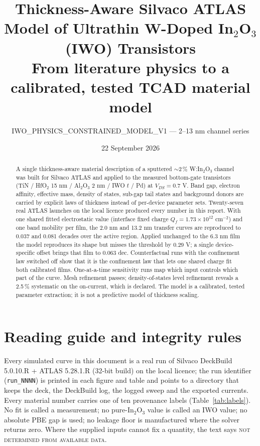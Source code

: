 \documentclass[11pt,a4paper]{article}
\title{Thickness-Aware Silvaco ATLAS Model of Ultrathin W-Doped In$_2$O$_3$ (IWO) Transistors\\[4pt]
\large From literature physics to a calibrated, tested TCAD material model}
\author{IWO\_PHYSICS\_CONSTRAINED\_MODEL\_V1 --- 2--13 nm channel series}
\date{22 September 2026}
\newcommand{\ND}{\textsc{not determined from available data}}
\begin{document}
\maketitle

\begin{abstract}
A single thickness-aware material description of a sputtered $\sim$2\,\% W:In$_2$O$_3$ channel was built for Silvaco ATLAS and applied to the measured bottom-gate transistors (TiN / HfO$_2$ 15 nm / Al$_2$O$_3$ 2 nm / IWO $t$ / Pd) at $V_{DS}=0.7$ V. Band gap, electron affinity, effective mass, density of states, sub-gap tail states and background donors are carried by explicit laws of thickness instead of per-device parameter sets. Twenty-seven real ATLAS launches on the local licence produced every number in this report. With one shared fitted electrostatic value (interface fixed charge $Q_f=1.73\times10^{12}$ cm$^{-2}$) and one band mobility per film, the 2.0 nm and 13.2 nm transfer curves are reproduced to 0.037 and 0.081 decades over the active region. Applied unchanged to the 6.3 nm film the model reproduces its shape but misses the threshold by 0.29 V; a single device-specific offset brings that film to 0.063 dec. Counterfactual runs with the confinement law switched off show that it is the confinement law that lets one shared charge fit both calibrated films. One-at-a-time sensitivity runs map which input controls which part of the curve. Mesh refinement passes; density-of-states level refinement reveals a 2.5\,\% systematic on the on-current, which is declared. The model is a calibrated, tested parameter extraction; it is not a predictive model of thickness scaling.
\end{abstract}

\tableofcontents
\clearpage

\section{Reading guide and integrity rules}
Every simulated curve in this document is a real run of Silvaco DeckBuild 5.0.10.R + ATLAS 5.28.1.R (32-bit build) on the local licence; the run identifier (\texttt{run\_NNNN}) is printed in each figure and table and points to a directory that keeps the deck, the DeckBuild log, the logged sweep and the exported currents. Every material number carries one of ten provenance labels (Table~\ref{tab:labels}). No fit is called a measurement; no pure-In$_2$O$_3$ value is called an IWO value; no absolute PBE gap is used; no leakage floor is manufactured where the solver returns zero. Where the supplied inputs cannot fix a quantity, the text says \ND.
\end{document}
